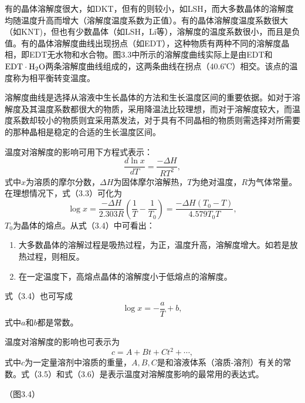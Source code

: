 有的晶体溶解度很大，如DKT，但有的则较小，如LSH，而大多数晶体的溶解度均随温度升高而增大（溶解度温度系数为正值）。有的晶体溶解度温度系数很大（如KNT)，但也有少数晶体（如LSH，Li等），溶解度的温度系数很小，而且是负值。有的晶体溶解度曲线出现拐点（如EDT），这种物质有两种不同的溶解度晶相，即EDT无水物和水合物。图3.3中所示的溶解度曲线实际上是由EDT和$\rm EDT\cdot H_2O$两条溶解度曲线组成的，这两条曲线在拐点（40.6℃）相交。该点的温度称为相平衡转变温度。

溶解度曲线是选择从溶液中生长晶体的方法和生长温度区间的重要依据。如对于溶解度及其温度系数都很大的物质，采用降温法比较理想，而对于溶解度较大，而温度系数却较小的物质则宜采用蒸发法，对于具有不同晶相的物质则需选择对所需要的那种晶相是稳定的合适的生长温度区间。

温度对溶解度的影响可用下方程式表示：
\begin{equation}
\frac{d\ln{x}}{dT}=\frac{-\Delta H}{RT^2},
\end{equation}
式中$x$为溶质的摩尔分数，$\Delta H$为固体摩尔溶解热，$T$为绝对温度，$R$为气体常量。在理想情况下，式（3.3）可化为
\begin{equation}
\log x=\frac{-\Delta H}{2.303R}\left( \frac{1}{T}-\frac{1}{T_0}\right) =\frac{-\Delta H(T_0-T)}{4.579T_0T},
\end{equation}
$T_0$为晶体的熔点。从式（3.4）中可看出：
\begin{enumerate}[(1)]
\item 大多数晶体的溶解过程是吸热过程，为正，温度升高，溶解度增大。如若是放热过程，则相反。
\item 在一定温度下，高熔点晶体的溶解度小于低熔点的溶解度。
\end{enumerate}

式（3.4）也可写成
\begin{equation}
\log x = -\frac{a}{T} + b,
\end{equation}
式中$a$和$b$都是常数。

温度对溶解度的影响也可表示为
\begin{equation}
c=A+Bt+Ct^2+\cdots,
\end{equation}
式中$c$为一定量溶剂中溶质的重量，$A,B,C$是和溶液体系（溶质-溶剂）有关的常数。式（3.5）和式（3.6）是表示温度对溶解度影响的最常用的表达式。

（图3.4）


